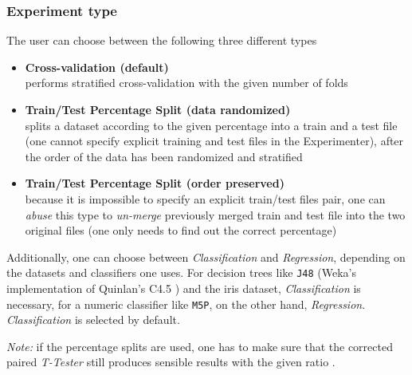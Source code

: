 \subsubsection{Experiment type}

The user can choose between the following three different types

\begin{itemize}
	\item \textbf{Cross-validation (default)} \\
      performs stratified cross-validation with the given number of folds 

   \item \textbf{Train/Test Percentage Split (data randomized)} \\
      splits a dataset according to the given percentage into a train and a test file (one cannot specify explicit training and test files in the Experimenter), after the order of the data has been randomized and stratified
	
	\begin{center}
	\end{center}

    \item \textbf{Train/Test Percentage Split (order preserved)} \\
      because it is impossible to specify an explicit train/test files pair, one can \textit{abuse} this type to \textit{un-merge} previously merged train and test file into the two original files (one only needs to find out the correct percentage) 
	
	\begin{center}
	\end{center}
	
\end{itemize}

Additionally, one can choose between \textit{Classification} and \textit{Regression}, depending on the datasets and classifiers one uses. For decision trees like \texttt{J48} (Weka's implementation of Quinlan's C4.5 \cite{quinlan}) and the iris dataset, \textit{Classification} is necessary, for a numeric classifier like \texttt{M5P}, on the other hand, \textit{Regression}. \textit{Classification} is selected by default.

\textit{Note:} if the percentage splits are used, one has to make sure that the corrected paired \textit{T-Tester} still produces sensible results with the given ratio \cite{bengio}.


